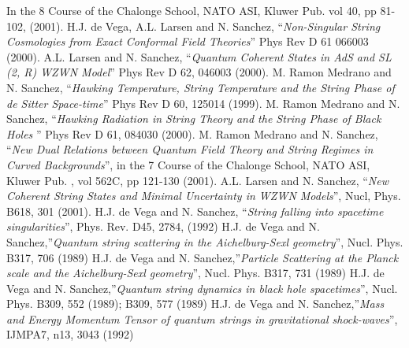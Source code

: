\documentclass[12pt,a4paper]{article}
\begin{document}
\begin{thebibliography}{23}
In the 8\coordHE{} Course of the Chalonge School, NATO ASI, Kluwer Pub. vol 40, 
pp 81-102, (2001).
 H.J. de Vega, A.L. Larsen and N. Sanchez, ``{\it Non-Singular 
String Cosmologies from Exact Conformal Field Theories}'' Phys Rev D 61
066003 (2000).
 A.L. Larsen and N. Sanchez, ``{\it Quantum Coherent States in AdS and SL (2, R) WZWN Model}'' Phys Rev D 62, 046003 (2000).
 M. Ramon Medrano and N. Sanchez, ``{\it Hawking Temperature, 
String Temperature and the String Phase of de Sitter Space-time}'' Phys Rev 
D 60, 125014 (1999).
 M. Ramon Medrano and N. Sanchez, ``{\it Hawking Radiation in 
String Theory and the String Phase of Black Holes }'' Phys Rev D 61, 084030 
(2000).
 M. Ramon Medrano and N. Sanchez, ``{\it New Dual Relations 
between Quantum Field Theory and String Regimes in Curved Backgrounds}'', in 
the 7\coordHE{} Course of the Chalonge School, NATO ASI, Kluwer Pub. , vol 562C, 
pp 121-130 (2001).
 A.L. Larsen and N. Sanchez, ``{\it New Coherent String States and Minimal Uncertainty in WZWN Models}'', Nucl, Phys. B618, 301 (2001).
 H.J. de Vega and N. Sanchez, ``{\it String falling into 
spacetime singularities}'', Phys. Rev. D45, 2784, (1992)
 H.J. de Vega and N. Sanchez,''{\it Quantum string 
scattering in the Aichelburg-Sexl geometry}'', Nucl. Phys. B317, 706 (1989)
 H.J. de Vega and N. Sanchez,''{\it Particle Scattering at the Planck scale and the Aichelburg-Sexl geometry}'', Nucl. Phys. B317, 731 (1989)
 H.J. de Vega and N. Sanchez,''{\it Quantum string dynamics in black hole spacetimes}'', Nucl. Phys. B309, 552 (1989); 
B309, 577 (1989)
 H.J. de Vega and N. Sanchez,''{\it Mass and Energy Momentum Tensor of quantum strings in gravitational shock-waves}'', 
IJMPA7, n\coordHE{}13, 3043 (1992)

\end{thebibliography}
\end{document}
